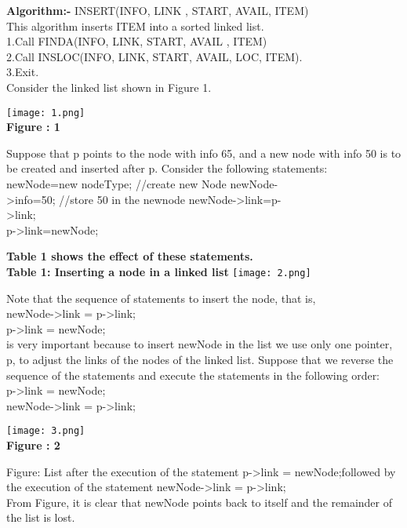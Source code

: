 \documentclass[11pt]{article}            %
\begin{document}
\textbf{Algorithm:-}
INSERT(INFO, LINK , START, AVAIL, ITEM)\\
This algorithm inserts ITEM into a sorted linked list.\\
1.Call FINDA(INFO, LINK, START, AVAIL , ITEM)\\
2.Call INSLOC(INFO, LINK, START, AVAIL, LOC, ITEM).\\
3.Exit.\\
Consider the linked list shown in Figure 1.\\
\begin{center}
\texttt{[image: 1.png]}\\
\textbf{Figure : 1}
\end{center}
Suppose that p points to the node with info 65, and a new node with info 50 is to be created
and inserted after p. Consider the following statements:\\
newNode=new nodeType; //create new Node newNode-\\
>info=50; //store 50 in the newnode newNode->link=p-\\
>link;\\
p->link=newNode;\\
\begin{center}
\textbf{Table 1 shows the effect of these statements.\\ Table 1: Inserting a node in a linked list}
\texttt{[image: 2.png]}
\end{center}

Note that the sequence of statements to insert the node, that is,\\
newNode->link = p->link;\\
p->link = newNode;\\
is very important because to insert newNode in the list we use only one pointer, p, to adjust
the links of the nodes of the linked list. Suppose that we reverse the sequence of the
statements and execute the statements in the following order:\\
p->link = newNode;\\
newNode->link = p->link;\\

\begin{center}
\texttt{[image: 3.png]}\\
\textbf{Figure : 2}
\end{center}
Figure: List after the execution of the statement p->link = newNode;followed by the
execution of the statement newNode->link = p->link;\\
From Figure, it is clear that newNode points back to itself and the remainder of the list is lost.\\
\end{document}
